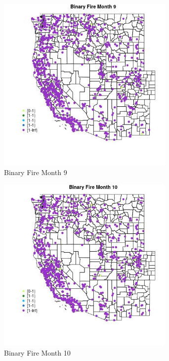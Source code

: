 \begin{figure} 
\centering  
\includegraphics[width=0.77\textwidth]{Code_Outputs/Report_ML_input_PM25_Step4_part_f_de_duplicated_aveswNAs_MapObsMo9Binary_Fire.jpg} 
\caption{\label{fig:Report_ML_input_PM25_Step4_part_f_de_duplicated_aveswNAsMapObsMo9Binary_Fire}Binary Fire Month 9} 
\end{figure} 
 

\begin{figure} 
\centering  
\includegraphics[width=0.77\textwidth]{Code_Outputs/Report_ML_input_PM25_Step4_part_f_de_duplicated_aveswNAs_MapObsMo10Binary_Fire.jpg} 
\caption{\label{fig:Report_ML_input_PM25_Step4_part_f_de_duplicated_aveswNAsMapObsMo10Binary_Fire}Binary Fire Month 10} 
\end{figure} 
 

